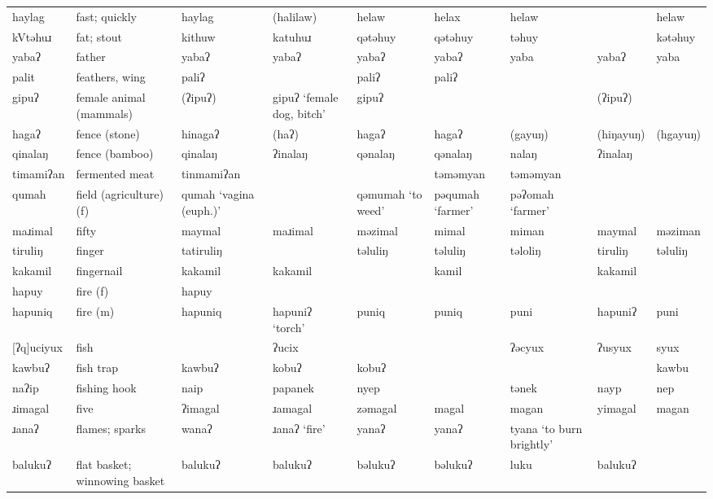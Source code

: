 \begin{landscape}
\begin{longtable}{*{9}{>{\raggedright\arraybackslash}p{}}}
\text{*}haylag       & fast; quickly & haylag & (halilaw) & helaw & helax & helaw &  & helaw\\
\text{*}kVtəhuɹ      & fat; stout & kithuw & katuhuɹ & qətəhuy & qətəhuy & təhuy &  & kətəhuy\\
\text{*}yabaʔ        & father & yabaʔ & yabaʔ & yabaʔ & yabaʔ & yaba & yabaʔ & yaba\\
\text{*}palit        & feathers, wing & paliʔ &  & paliʔ & paliʔ &  &  & \\
\text{*}gipuʔ        & female animal (mammals) & (ʔipuʔ) & gipuʔ `female dog, bitch' & gipuʔ &  &  & (ʔipuʔ) & \\
\text{*}hagaʔ        & fence (stone) & hinagaʔ & (haʔ) & hagaʔ & hagaʔ & (gayuŋ) & (hiŋayuŋ) & (hgayuŋ)\\
\text{*}qinalaŋ      & fence (bamboo) & qinalaŋ & ʔinalaŋ & qənalaŋ & qənalaŋ & nalaŋ & ʔinalaŋ & \\
\text{*}timamiʔan    & fermented meat & tinmamiʔan &  &  & təməmyan & təməmyan &  & \\
\text{*}qumah        & field (agriculture) (f) & qumah `vagina (euph.)' &  & qəmumah \newline `to weed' & pəqumah `farmer' & pəʔomah `farmer' &  & \\
\text{*}maɹimal      & fifty & maymal & maɹimal & məzimal & mimal & miman & maymal & məziman\\
\text{*}tiruliŋ      & finger & tatiruliŋ &  & təluliŋ & təluliŋ & təloliŋ & tiruliŋ & təluliŋ\\
\text{*}kakamil      & fingernail & kakamil & kakamil &  & kamil &  & kakamil & \\
\text{*}hapuy        & fire (f) & hapuy &  &  &  &  &  & \\
\text{*}hapuniq      & fire (m) & hapuniq & hapuniʔ `torch' & puniq & puniq & puni & hapuniʔ & puni\\
\text{*}[ʔq]uciyux   & fish &  & ʔucix &  &  & ʔəcyux & ʔusyux & syux\\
\text{*}kawbuʔ       & fish trap & kawbuʔ & kobuʔ & kobuʔ &  &  &  & kawbu\\
\text{*}naʔip        & fishing hook & naip & papanek & nyep &  & tənek & nayp & nep\\
\text{*}ɹimagal      & five & ʔimagal & ɹamagal & zəmagal & magal & magan & yimagal & magan\\
\text{*}ɹanaʔ        & flames; sparks & wanaʔ & ɹanaʔ `fire' & yanaʔ & yanaʔ & tyana `to burn brightly' &  & \\
\text{*}balukuʔ      & flat basket; winnowing basket & balukuʔ & balukuʔ & bəlukuʔ & bəlukuʔ & luku & balukuʔ & \\

\end{longtable}
\end{landscape}
